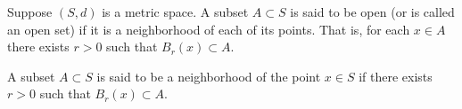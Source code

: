 Suppose $(S, d)$ is a metric space. A subset $A \subset S$ is said to be open (or is called an open set) if it is a neighborhood of each of its points. That is, for each $x \in A$ there exists $r > 0$ such that $B_r(x) \subset A$.

A subset $A \subset S$ is said to be a neighborhood of the point $x \in S$ if there exists $r > 0$ such that $B_r(x) \subset A$.
